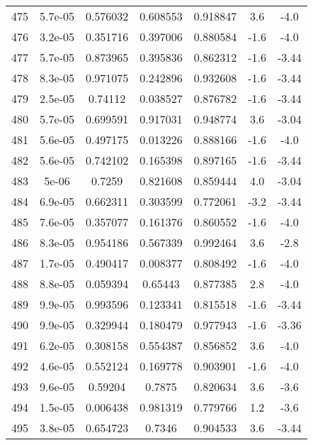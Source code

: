 \begin{table}
\begin{tabular}{c|c|c|c|c|c|c}
475 & 5.7e-05 & 0.576032 & 0.608553 & 0.918847 & 3.6 & -4.0\\
476 & 3.2e-05 & 0.351716 & 0.397006 & 0.880584 & -1.6 & -4.0\\
477 & 5.7e-05 & 0.873965 & 0.395836 & 0.862312 & -1.6 & -3.44\\
478 & 8.3e-05 & 0.971075 & 0.242896 & 0.932608 & -1.6 & -3.44\\
479 & 2.5e-05 & 0.74112 & 0.038527 & 0.876782 & -1.6 & -3.44\\
480 & 5.7e-05 & 0.699591 & 0.917031 & 0.948774 & 3.6 & -3.04\\
481 & 5.6e-05 & 0.497175 & 0.013226 & 0.888166 & -1.6 & -4.0\\
482 & 5.6e-05 & 0.742102 & 0.165398 & 0.897165 & -1.6 & -3.44\\
483 & 5e-06 & 0.7259 & 0.821608 & 0.859444 & 4.0 & -3.04\\
484 & 6.9e-05 & 0.662311 & 0.303599 & 0.772061 & -3.2 & -3.44\\
485 & 7.6e-05 & 0.357077 & 0.161376 & 0.860552 & -1.6 & -4.0\\
486 & 8.3e-05 & 0.954186 & 0.567339 & 0.992464 & 3.6 & -2.8\\
487 & 1.7e-05 & 0.490417 & 0.008377 & 0.808492 & -1.6 & -4.0\\
488 & 8.8e-05 & 0.059394 & 0.65443 & 0.877385 & 2.8 & -4.0\\
489 & 9.9e-05 & 0.993596 & 0.123341 & 0.815518 & -1.6 & -3.44\\
490 & 9.9e-05 & 0.329944 & 0.180479 & 0.977943 & -1.6 & -3.36\\
491 & 6.2e-05 & 0.308158 & 0.554387 & 0.856852 & 3.6 & -4.0\\
492 & 4.6e-05 & 0.552124 & 0.169778 & 0.903901 & -1.6 & -4.0\\
493 & 9.6e-05 & 0.59204 & 0.7875 & 0.820634 & 3.6 & -3.6\\
494 & 1.5e-05 & 0.006438 & 0.981319 & 0.779766 & 1.2 & -3.6\\
495 & 3.8e-05 & 0.654723 & 0.7346 & 0.904533 & 3.6 & -3.44\\
\end{tabular}
\end{table}
\newpage
